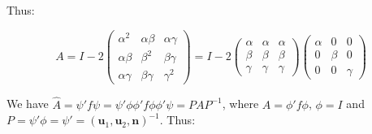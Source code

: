 \documentclass[12pt]{article}
\begin{document}
Thus:

\begin{equation}
    A =
    I - 2 \begin{pmatrix}
        \alpha^{2}   & \alpha\beta & \alpha\gamma \\
        \alpha\beta  & \beta^{2}   & \beta\gamma  \\
        \alpha\gamma & \beta\gamma & \gamma^{2}
    \end{pmatrix}
    =
    I - 2 \begin{pmatrix}
        \alpha & \alpha & \alpha \\
        \beta  & \beta  & \beta  \\
        \gamma & \gamma & \gamma
    \end{pmatrix}
    \begin{pmatrix}
        \alpha & 0     & 0      \\
        0      & \beta & 0      \\
        0      & 0     & \gamma
    \end{pmatrix}
\end{equation}

We have $\hat{A} = \psi' f \psi = \psi' \phi \phi' f \phi \phi' \psi = PAP^{-1}$, where $A = \phi' f \phi$, $\phi = I$ and $P = \psi' \phi = \psi' = \left( \mathbf{u}_{1}, \mathbf{u}_{2}, \mathbf{n} \right)^{-1}$. Thus:
\end{document}

